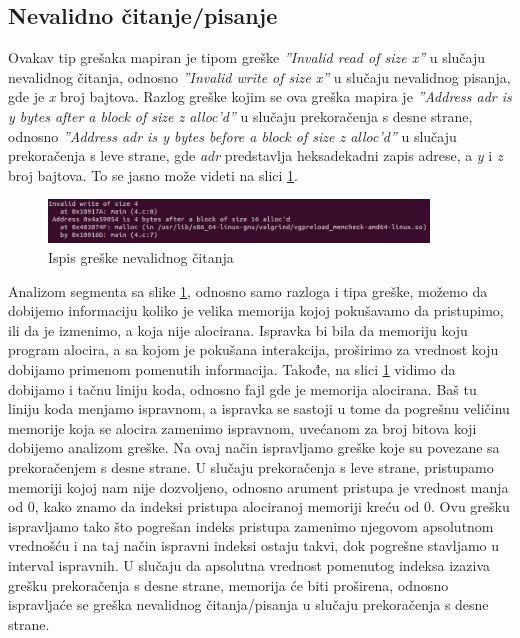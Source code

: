 \documentclass[12pt,oneside]{memoir}
\theoremstyle{plain}
\theoremstyle{definition}
\begin{document}
\subsection{Nevalidno čitanje/pisanje}
Ovakav tip grešaka mapiran je tipom greške \textit{''Invalid read of size x''} u slučaju nevalidnog čitanja, odnosno \textit{''Invalid write of size x''} u slučaju nevalidnog pisanja, gde je \textit{x} broj bajtova. Razlog greške kojim se ova greška mapira je \textit{''Address adr is y bytes after a block of size z alloc'd''} u slučaju prekoračenja s desne strane, odnosno \textit{''Address adr is y bytes before a block of size z alloc'd''} u slučaju prekoračenja s leve strane, gde \textit{adr} predstavlja heksadekadni zapis adrese, a \textit{y} i \textit{z} broj bajtova. To se jasno može videti na slici \ref{fig:slika4.8}.

\begin{figure}[!ht]
  \centering
  \includegraphics[width=0.9\textwidth]{InvalidReadErrorExample.png}
  \caption{Ispis greške nevalidnog čitanja}
  \label{fig:slika4.8}
\end{figure} 

Analizom segmenta sa slike \ref{fig:slika4.8}, odnosno samo razloga i tipa greške, možemo da dobijemo informaciju koliko je velika memorija kojoj pokušavamo da pristupimo, ili da je izmenimo, a koja nije alocirana. Ispravka bi bila da memoriju koju program alocira, a sa kojom je pokušana interakcija, proširimo za vrednost koju dobijamo primenom pomenutih informacija. Takođe, na slici \ref{fig:slika4.8} vidimo da dobijamo i tačnu liniju koda, odnosno fajl gde je memorija alocirana. Baš tu liniju koda menjamo ispravnom, a ispravka se sastoji u tome da pogrešnu veličinu memorije koja se alocira zamenimo ispravnom, uvećanom za broj bitova koji dobijemo analizom greške. Na ovaj način ispravljamo greške koje su povezane sa prekoračenjem s desne strane. U slučaju prekoračenja s leve strane, pristupamo memoriji kojoj nam nije dozvoljeno, odnosno arument pristupa je vrednost manja od 0, kako znamo da indeksi pristupa alociranoj memoriji kreću od 0. Ovu grešku ispravljamo tako što pogrešan indeks pristupa zamenimo njegovom apsolutnom vrednošću i na taj način ispravni indeksi ostaju takvi, dok pogrešne stavljamo u interval ispravnih. U slučaju da apsolutna vrednost pomenutog indeksa izaziva grešku prekoračenja s desne strane, memorija će biti proširena, odnosno ispravljaće se greška nevalidnog čitanja/pisanja u slučaju prekoračenja s desne strane.  
\end{document}
